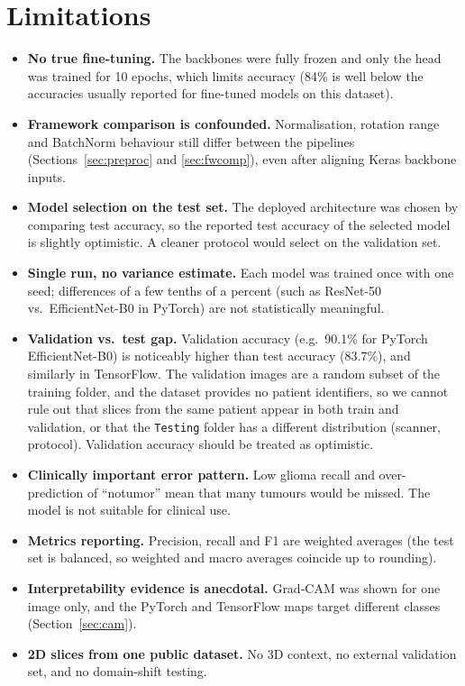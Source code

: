 \documentclass[11pt,a4paper]{article}
\begin{document}
\section{Limitations}
\begin{itemize}
  \item \textbf{No true fine-tuning.} The backbones were fully frozen and only the head was trained for 10 epochs, which limits accuracy (84\% is well below the accuracies usually reported for fine-tuned models on this dataset).
  \item \textbf{Framework comparison is confounded.} Normalisation, rotation range and BatchNorm behaviour still differ between the pipelines (Sections~\ref{sec:preproc} and \ref{sec:fwcomp}), even after aligning Keras backbone inputs.
  \item \textbf{Model selection on the test set.} The deployed architecture was chosen by comparing test accuracy, so the reported test accuracy of the selected model is slightly optimistic. A cleaner protocol would select on the validation set.
  \item \textbf{Single run, no variance estimate.} Each model was trained once with one seed; differences of a few tenths of a percent (such as ResNet-50 vs.\ EfficientNet-B0 in PyTorch) are not statistically meaningful.
  \item \textbf{Validation vs.\ test gap.} Validation accuracy (e.g.\ 90.1\% for PyTorch EfficientNet-B0) is noticeably higher than test accuracy (83.7\%), and similarly in TensorFlow. The validation images are a random subset of the training folder, and the dataset provides no patient identifiers, so we cannot rule out that slices from the same patient appear in both train and validation, or that the \texttt{Testing} folder has a different distribution (scanner, protocol). Validation accuracy should be treated as optimistic.
  \item \textbf{Clinically important error pattern.} Low glioma recall and over-prediction of ``notumor'' mean that many tumours would be missed. The model is not suitable for clinical use.
  \item \textbf{Metrics reporting.} Precision, recall and F1 are weighted averages (the test set is balanced, so weighted and macro averages coincide up to rounding).
  \item \textbf{Interpretability evidence is anecdotal.} Grad-CAM was shown for one image only, and the PyTorch and TensorFlow maps target different classes (Section~\ref{sec:cam}).
  \item \textbf{2D slices from one public dataset.} No 3D context, no external validation set, and no domain-shift testing.
\end{itemize}
\end{document}
